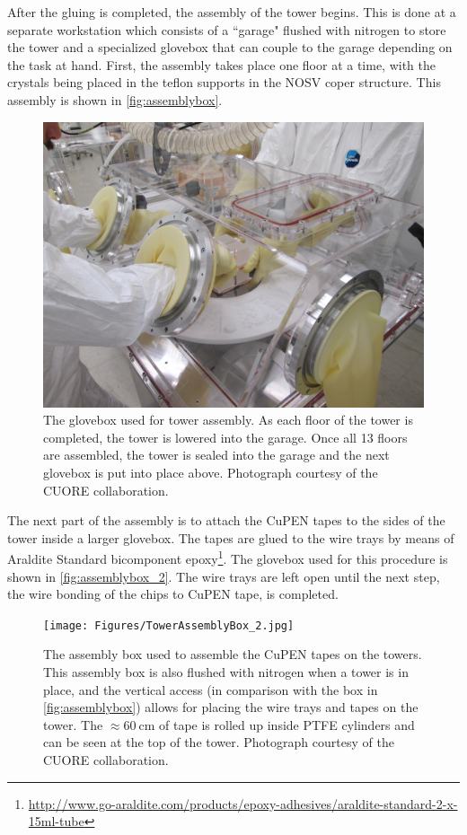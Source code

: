 After the gluing is completed, the assembly of the tower begins.
This is done at a separate workstation which consists of a ``garage" flushed with nitrogen to store the tower and a specialized glovebox that can couple to the garage depending on the task at hand.
First, the assembly takes place one floor at a time, with the crystals being placed in the teflon supports in the NOSV coper structure.
This assembly is shown in \autoref{fig:assemblybox}.

\begin{figure}[htbp]
    \centering
    \includegraphics[width=0.6\linewidth]{Figures/TowerAssemblyBox.jpg}
    \caption[The glovebox used for tower assembly.]
    {The glovebox used for tower assembly.
    As each floor of the tower is completed, the tower is lowered into the garage.
    Once all 13 floors are assembled, the tower is sealed into the garage and the next glovebox is put into place above.
    Photograph courtesy of the CUORE collaboration.}
    \label{fig:assemblybox}
\end{figure}

The next part of the assembly is to attach the CuPEN tapes to the sides of the tower inside a larger glovebox.
The tapes are glued to the wire trays by means of Araldite Standard bicomponent epoxy\footnote{\RaggedRight\url{http://www.go-araldite.com/products/epoxy-adhesives/araldite-standard-2-x-15ml-tube}}.
The glovebox used for this procedure is shown in \autoref{fig:assemblybox_2}.
The wire trays are left open until the next step, the wire bonding of the chips to CuPEN tape, is completed.


\begin{figure}[htbp]
    \centering
    \texttt{[image: Figures/TowerAssemblyBox\_2.jpg]}
    \caption[The assembly box used to assemble the CuPEN tapes on the towers.]
    {The assembly box used to assemble the CuPEN tapes on the towers.
    This assembly box is also flushed with nitrogen when a tower is in place, and the vertical access (in comparison with the box in \autoref{fig:assemblybox}) allows for placing the wire trays and tapes on the tower.
    The $\approx60~\textrm{cm}$ of tape is rolled up inside PTFE cylinders and can be seen at the top of the tower.
    Photograph courtesy of the CUORE collaboration.}
    \label{fig:assemblybox_2}
\end{figure}

